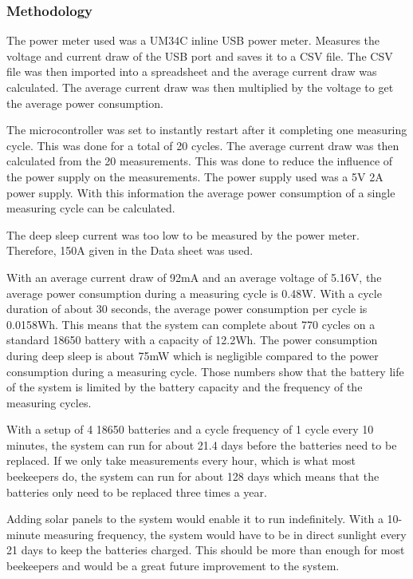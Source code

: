 \subsubsection{Methodology}
The power meter used was a UM34C inline USB power meter. Measures the voltage and current draw of the USB port and saves it to a \Gls{CSV} file. The CSV file was then imported into a spreadsheet and the average current draw was calculated. The average current draw was then multiplied by the voltage to get the average power consumption.

The microcontroller was set to instantly restart after it completing one measuring cycle. This was done for a total of 20 cycles. The average current draw was then calculated from the 20 measurements. This was done to reduce the influence of the power supply on the measurements. The power supply used was a 5V 2A power supply. With this information the average power consumption of a single measuring cycle can be calculated.

The deep sleep current was too low to be measured by the power meter. Therefore, 150\mu A given in the \gls{Data sheet} \cite{espressif_esp32} was used. 

With an average current draw of 92mA and an average voltage of 5.16V, the average power consumption during a measuring cycle is 0.48W. With a cycle duration of about 30 seconds, the average power consumption per cycle is 0.0158Wh. This means that the system can complete about 770 cycles on a standard 18650 battery with a capacity of 12.2Wh. The power consumption during deep sleep is about 75mW  which is negligible compared to the power consumption during a measuring cycle. Those numbers show that the battery life of the system is limited by the battery capacity and the frequency of the measuring cycles.

With a setup of 4 \Gls{18650} batteries and a cycle frequency of 1 cycle every 10 minutes, the system can run for about 21.4 days before the batteries need to be replaced. If we only take measurements every hour, which is what most beekeepers do, the system can run for about 128 days which means that the batteries only need to be replaced three times a year.

Adding solar panels to the system would enable it to run indefinitely. With a 10-minute measuring frequency, the system would have to be in direct sunlight every 21 days to keep the batteries charged. This should be more than enough for most beekeepers and would be a great future improvement to the system.


